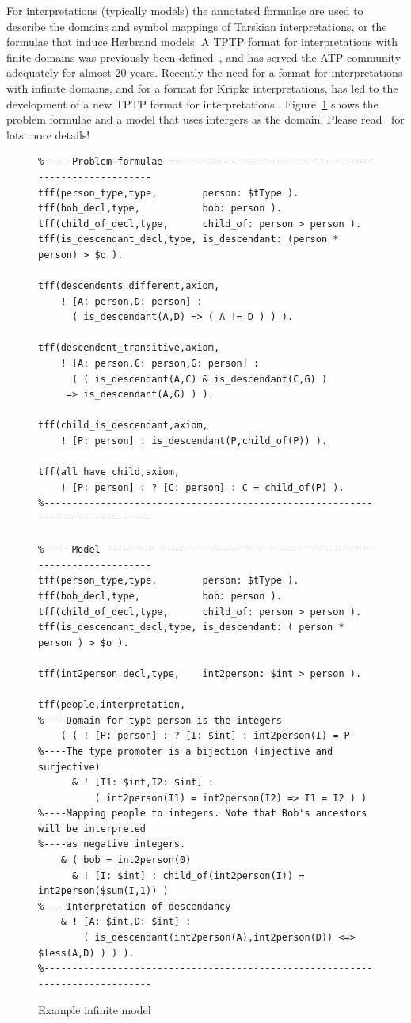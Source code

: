 \documentclass{easychair}
\begin{document}
For interpretations (typically models) the annotated formulae are used to describe the domains
and symbol mappings of Tarskian interpretations, or the formulae that induce Herbrand models.
A TPTP format for interpretations with finite domains was previously been defined~\cite{SS+06}, 
and has served the ATP community adequately for almost 20 years. 
Recently the need for a format for interpretations with infinite domains, and for a format for 
Kripke interpretations, has led to the development of a new TPTP format for interpretations
\cite{SSP24}.
Figure~\ref{ExampleModel} shows the problem formulae and a model that uses intergers as the domain.
Please read~\cite{SSP24} for lots more details!

\begin{figure}[htb]
{\footnotesize
{\setlength{\baselineskip}{3mm}
\begin{verbatim}
%---- Problem formulae --------------------------------------------------------
tff(person_type,type,        person: $tType ).
tff(bob_decl,type,           bob: person ).
tff(child_of_decl,type,      child_of: person > person ).
tff(is_descendant_decl,type, is_descendant: (person * person) > $o ).

tff(descendents_different,axiom,
    ! [A: person,D: person] : 
      ( is_descendant(A,D) => ( A != D ) ) ).

tff(descendent_transitive,axiom,
    ! [A: person,C: person,G: person] :
      ( ( is_descendant(A,C) & is_descendant(C,G) ) 
     => is_descendant(A,G) ) ).

tff(child_is_descendant,axiom,
    ! [P: person] : is_descendant(P,child_of(P)) ).

tff(all_have_child,axiom,
    ! [P: person] : ? [C: person] : C = child_of(P) ).
%------------------------------------------------------------------------------

%---- Model -------------------------------------------------------------------
tff(person_type,type,        person: $tType ).
tff(bob_decl,type,           bob: person ).
tff(child_of_decl,type,      child_of: person > person ).
tff(is_descendant_decl,type, is_descendant: ( person * person ) > $o ).

tff(int2person_decl,type,    int2person: $int > person ).

tff(people,interpretation,
%----Domain for type person is the integers
    ( ( ! [P: person] : ? [I: $int] : int2person(I) = P
%----The type promoter is a bijection (injective and surjective)
      & ! [I1: $int,I2: $int] : 
          ( int2person(I1) = int2person(I2) => I1 = I2 ) )
%----Mapping people to integers. Note that Bob's ancestors will be interpreted 
%----as negative integers.
    & ( bob = int2person(0)
      & ! [I: $int] : child_of(int2person(I)) = int2person($sum(I,1)) )
%----Interpretation of descendancy
    & ! [A: $int,D: $int] : 
        ( is_descendant(int2person(A),int2person(D)) <=> $less(A,D) ) ) ).
%------------------------------------------------------------------------------
\end{verbatim}
}}
\caption{Example infinite model}
\label{ExampleModel}
\end{figure}
\end{document}
